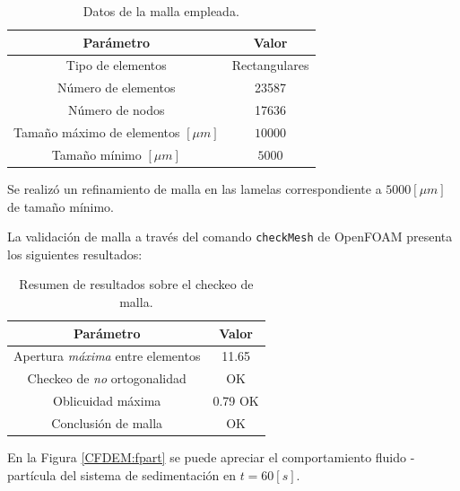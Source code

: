\begin{table}[h!]
	\centering
	\begin{tabular}{|c|c|}
		\hline
		\textbf{Par\'ametro} & \textbf{Valor} \\ \hline
		Tipo de elementos & Rectangulares \\ \hline
		N\'umero de elementos & 23587 \\ \hline
		N\'umero de nodos & 17636 \\ \hline
		Tama\~no m\'aximo de elementos $[\mu m]$ & $10000$ \\ \hline
		Tama\~no m\'inimo $[\mu m]$ & $5000$ \\ \hline	
	\end{tabular}
	\caption{Datos de la malla empleada.}
	\label{mallaF}
\end{table}

\noindent
\justify

Se realiz\'o un refinamiento de malla en las lamelas correspondiente a $5000 [\mu m]$ de tama\~no m\'inimo. 

\noindent
\justify

La validaci\'on de malla a trav\'es del comando \texttt{checkMesh} de OpenFOAM presenta los siguientes resultados:

\begin{table}[h!]
	\centering
	\begin{tabular}{|c|c|}
		\hline
		\textbf{Par\'ametro} & \textbf{Valor} \\ \hline
		Apertura \textit{m\'axima} entre elementos & 11.65 \\ \hline
		Checkeo de \textit{no} ortogonalidad & OK \\ \hline
		Oblicuidad m\'axima & 0.79 OK \\ \hline
		Conclusi\'on de malla & OK \\ \hline
	\end{tabular}
	\caption{Resumen de resultados sobre el checkeo de malla.}
	\label{check}
\end{table}

\noindent
\justify

En la Figura \ref{CFDEM:fpart} se puede apreciar el comportamiento fluido - part\'icula del sistema de sedimentaci\'on en $t = 60 [s]$.

